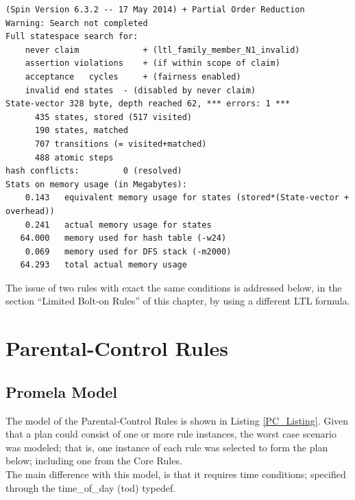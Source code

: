  \singlespacing
\begin{lstlisting}[caption=Invalidad Family Member\#1 Plan Verification,
  label=Family1Result_error]
(Spin Version 6.3.2 -- 17 May 2014) + Partial Order Reduction
Warning: Search not completed
Full statespace search for:
	never claim         	+ (ltl_family_member_N1_invalid)
	assertion violations	+ (if within scope of claim)
	acceptance   cycles 	+ (fairness enabled)
	invalid end states	- (disabled by never claim)
State-vector 328 byte, depth reached 62, *** errors: 1 ***
      435 states, stored (517 visited)
      190 states, matched
      707 transitions (= visited+matched)
      488 atomic steps
hash conflicts:         0 (resolved)
Stats on memory usage (in Megabytes):
    0.143	equivalent memory usage for states (stored*(State-vector + overhead))
    0.241	actual memory usage for states
   64.000	memory used for hash table (-w24)
    0.069	memory used for DFS stack (-m2000)
   64.293	total actual memory usage
\end{lstlisting}
\doublespacing

The issue of two rules with exact the same conditions is addressed below, in the section ``Limited Bolt-on Rules'' of this chapter, by using a different LTL formula. 

\section{Parental-Control Rules}
\subsection{Promela Model}
\noindent
The model of the Parental-Control Rules is shown in Listing \ref{PC_Listing}. Given that a plan could consist of one or more rule instances, the worst case scenario was modeled; that is, one instance of each rule was selected to form the plan below; including one from the Core Rules.  \\

The main difference with this model, is that it requires time conditions; specified through the time\_of\_day (tod) typedef. \\

